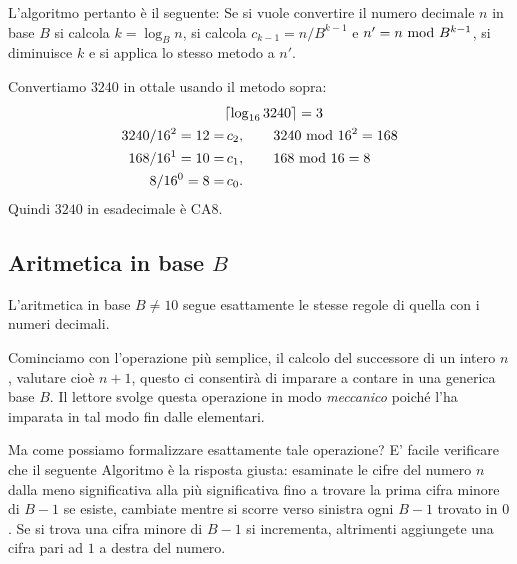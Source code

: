 L'algoritmo pertanto è il seguente: Se si vuole convertire il numero decimale $n$ in base $B$ si calcola $k = \log_B n$, si calcola $c_{k-1} = n / B^{k-1}$ e $n' = n \ \text{mod}\ B^{k-1}$, si diminuisce $k$ e si applica lo stesso metodo a $n'$.

\begin{ex}
Convertiamo $3240$ in ottale usando il metodo sopra:
\begin{align*}
  &\lceil \log_{16} 3240 \rceil = 3\\
  3240 / 16^2 = 12 = &\, c_2, \qquad 3240 \ \text{mod}\ 16^2 = 168\\
  168 / 16^1 = 10 = &\, c_1,  \qquad 168 \ \text{mod}\ 16 = 8\\
  8 / 16^0 = 8 = &\, c_0.
\end{align*}
Quindi $3240$ in esadecimale è $\mathrm{CA}8$.
\end{ex}

\subsection{Aritmetica in base $B$}

L'aritmetica in base $B\neq 10$ segue esattamente le stesse regole di quella con i numeri decimali.

Cominciamo con l'operazione più semplice, il calcolo del successore di un intero $n$, valutare cioè $n+1$, questo ci consentirà di imparare a contare in una generica base $B$. Il lettore svolge questa operazione in modo \emph{meccanico} poiché l'ha imparata in tal modo fin dalle elementari.

Ma come possiamo formalizzare esattamente tale operazione? E' facile verificare che il seguente Algoritmo è la risposta giusta:
esaminate le cifre del numero $n$ dalla meno significativa alla più
significativa fino a trovare la prima cifra minore di $B-1$ se esiste, cambiate
mentre si scorre verso sinistra ogni $B-1$ trovato in $0$. Se si trova una
cifra minore di $B-1$ si incrementa, altrimenti aggiungete una cifra pari ad
$1$ a destra del numero.

